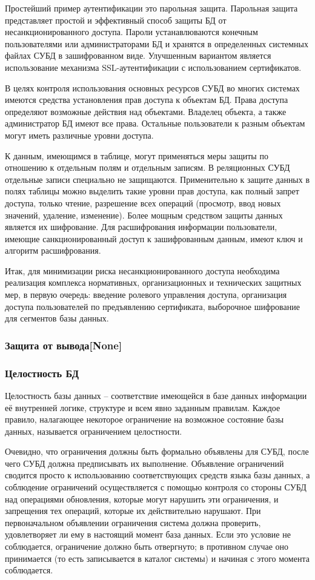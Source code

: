 Простейший пример аутентификации это парольная защита. Парольная защита представляет простой и эффективный способ защиты БД от несанкционированного доступа. Пароли устанавлюваются конечным пользователями или администраторами БД и хранятся в определенных системных файлах СУБД в зашифрованном виде. Улучшенным вариантом является использование механизма SSL-аутентификации с использованием сертификатов.

В целях контроля использования основных ресурсов СУБД во многих системах имеются средства установления прав доступа к объектам БД. Права доступа определяют возможные действия над объектами. Владелец объекта, а также администратор БД имеют все права. Остальные пользователи к разным объектам могут иметь различные уровни доступа.

К данным, имеющимся в таблице, могут применяться меры защиты по отношению к отдельным полям и отдельным записям. В реляционных СУБД отдельные записи специально не защищаются. Применительно к защите данных в полях таблицы можно выделить такие уровни прав доступа, как полный запрет доступа, только чтение, разрешение всех операций (просмотр, ввод новых значений, удаление, изменение).
Более мощным средством защиты данных является их шифрование. Для расшифрования информации пользователи, имеющие санкционированный доступ к зашифрованным данным, имеют ключ и алгоритм расшифрования.

Итак, для минимизации риска несанкционированного доступа необходима реализация комплекса нормативных, организационных и технических защитных мер, в первую очередь: введение ролевого управления доступа, организация доступа пользователей по предъявлению сертификата, выборочное шифрование для сегментов базы данных.

\subsubsection{Защита от вывода[None]}

\subsubsection{Целостность БД}
Целостность базы данных -- соответствие имеющейся в базе данных информации её внутренней логике, структуре и всем явно заданным правилам. Каждое правило, налагающее некоторое ограничение на возможное состояние базы данных, называется ограничением целостности.

Очевидно, что ограничения должны быть формально объявлены для СУБД, после чего СУБД должна предписывать их выполнение. Объявление ограничений сводится просто к использованию соответствующих средств языка базы данных, а соблюдение ограничений осуществляется с помощью контроля со стороны СУБД над операциями обновления, которые могут нарушить эти ограничения, и запрещения тех операций, которые их действительно нарушают. При первоначальном объявлении ограничения система должна проверить, удовлетворяет ли ему в настоящий момент база данных. Если это условие не соблюдается, ограничение должно быть отвергнуто; в противном случае оно принимается (то есть записывается в каталог системы) и начиная с этого момента соблюдается.

